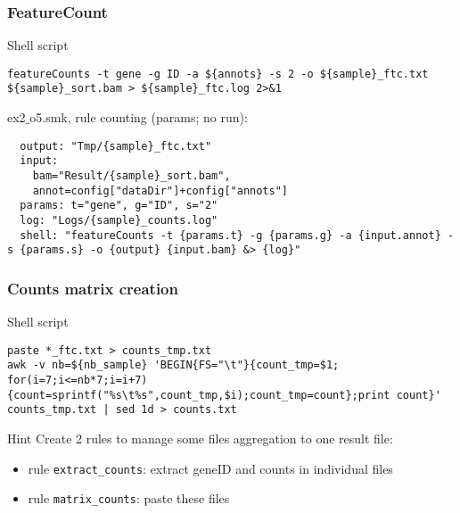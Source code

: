 \begin{frame}[containsverbatim]
\frametitle{FeatureCount}
\begin{exampleblock}{Shell script}
\begin{lstlisting}
featureCounts -t gene -g ID -a ${annots} -s 2 -o ${sample}_ftc.txt ${sample}_sort.bam > ${sample}_ftc.log 2>&1
\end{lstlisting}
\end{exampleblock}
\begin{exampleblock}{ex2$\_$o5.smk, rule counting (params; no run):}
\begin{lstlisting}
  output: "Tmp/{sample}_ftc.txt"
  input:
    bam="Result/{sample}_sort.bam",
    annot=config["dataDir"]+config["annots"]
  params: t="gene", g="ID", s="2"
  log: "Logs/{sample}_counts.log"
  shell: "featureCounts -t {params.t} -g {params.g} -a {input.annot} -s {params.s} -o {output} {input.bam} &> {log}"
\end{lstlisting}
\end{exampleblock}
\end{frame}
\begin{frame}[containsverbatim]
\frametitle{Counts matrix creation}
\begin{exampleblock}{Shell script}
\begin{lstlisting}
paste *_ftc.txt > counts_tmp.txt
awk -v nb=${nb_sample} 'BEGIN{FS="\t"}{count_tmp=$1; for(i=7;i<=nb*7;i=i+7){count=sprintf("%s\t%s",count_tmp,$i);count_tmp=count};print count}' counts_tmp.txt | sed 1d > counts.txt
\end{lstlisting}
\end{exampleblock}
\begin{exampleblock}{Hint}
Create 2 rules to manage some files aggregation to one result file:
\begin{itemize}
    \item rule \verb|extract_counts|: extract geneID and counts in individual files
    \item rule \verb|matrix_counts|: paste these files
\end{itemize} 
\end{exampleblock}
\end{frame}
